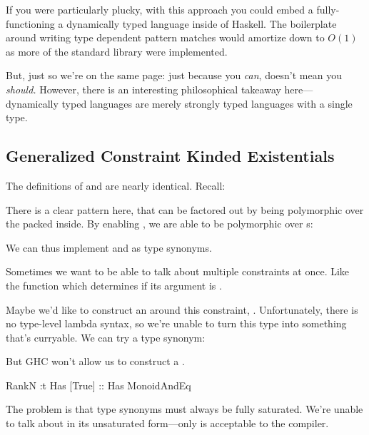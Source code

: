 \documentclass[book.tex]{subfiles}
\begin{document}
If you were particularly plucky, with this approach you could embed a
fully-functioning a dynamically typed language inside of Haskell. The
boilerplate around writing type dependent pattern matches would amortize down to
$O(1)$ as more of the standard library were implemented.

But, just so we're on the same page: just because you \emph{can}, doesn't mean
you \emph{should.} However, there is an interesting philosophical takeaway
here---dynamically typed languages are merely strongly typed languages with a
single type.


\subsection{Generalized Constraint Kinded Existentials}

The definitions of  and  are nearly identical. Recall:


There is a clear pattern here, that can be factored out by being polymorphic
over the  packed inside. By enabling , we
are able to be polymorphic over s:


We can thus implement  and  as type synonyms.


Sometimes we want to be able to talk about multiple constraints at once. Like
the function which determines if its argument is .


Maybe we'd like to construct an  around this constraint, . Unfortunately, there is no type-level lambda syntax, so we're unable to
turn this type into something that's curryable. We can try a type synonym:


But GHC won't allow us to construct a .

\begin{dorepl}{RankN}
:t Has [True] :: Has MonoidAndEq
\end{dorepl}

The problem is that type synonyms must always be fully saturated. We're unable
to talk about  in its unsaturated form---only 
is acceptable to the compiler.
\end{document}
